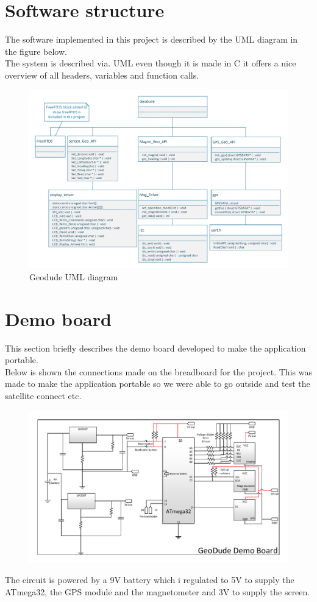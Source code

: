 \section{Software structure}
The software implemented in this project is described by the UML diagram in the figure below.\\
The system is described via. UML even though it is made in C it offers a nice overview of all headers, variables and function calls.

\begin{figure}[hbpt]
\centering
\includegraphics[width=1\textwidth]{billeder/geodude_UML}
\caption{Geodude UML diagram}
\end{figure}

\section{Demo board}
This section briefly describes the demo board developed to make the application portable.\\
Below is shown the connections made on the breadboard for the project. This was made to make the application portable so we were able to go outside and test the satellite connect etc.

\begin{figure}[H]
\centering
\includegraphics[width=1\textwidth]{billeder/GeodudeDemoBoard}
\end{figure}

The circuit is powered by a 9V battery which i regulated to 5V to supply the ATmega32, the GPS module and the magnetometer and 3V to supply the screen.